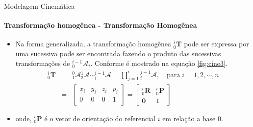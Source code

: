 \documentclass{beamer}
\begin{document}
\begin{frame}{Modelagem Cinemática}
    \framesubtitle{Transformação homogênea - Transformação Homogênea}
    \begin{itemize}
        \item Na forma generalizada, a transformação homogênea ${}^{i}_0\mathbf{T}$ pode ser expressa por uma sucessiva pode ser encontrada fazendo o produto das sucessivas transformações de ${}^{i-1}_0\mathcal{A}_i$. Conforme é mostrado na equação \eqref{fig:cine3}.
        \begin{equation}\label{fig:cine3}
        \begin{array}{lcl}
        {}^i_0\mathbf{T} &= & {}^0_1\mathcal{A}{}^1_2\mathcal{A} \cdots {}^{i-1}_i\mathcal{A} = \prod \limits^i_{j=1}{}^{j-1}_i\mathcal{A}, \quad \mathrm{para\;}i=1,2,\cdots,n\\[.2cm]
        & = &
        \begin{bmatrix}
        x_i & y_i & z_i & p_i\\
        0 & 0 & 0 & 1
        \end{bmatrix} = 
        \begin{bmatrix}
        {}^i_0\mathbf{R} & {}^i_0\mathbf{P}\\
        \mathbf{0} & 1
        \end{bmatrix}
        \end{array}
        \end{equation}      
        \item onde, ${}^i_0\mathbf{P}$ é o vetor de orientação do referencial $i$ em relação a base $0$.
    \end{itemize}

\end{frame}
\end{document}

